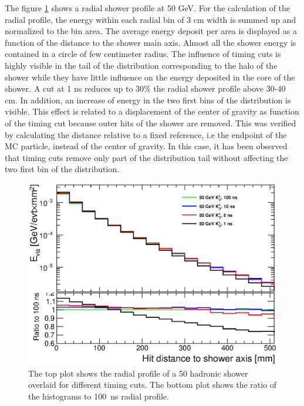 The figure \ref{fig:RadialProfNoSmearing} shows a \kzeroL{} radial shower profile at 50 GeV. For the calculation of the radial profile, the energy within each radial bin of 3 cm width is summed up and normalized to the bin area. The average energy deposit per area is displayed as a function of the distance to the shower main axis. Almost all the shower energy is contained in a circle of few centimeter radius. The influence of timing cuts is highly visible in the tail of the distribution corresponding to the halo of the shower while they have little influence on the energy deposited in the core of the shower. A cut at 1 ns reduces up to 30\% the radial shower profile above 30-40 cm. In addition, an increase of energy in the two first bins of the distribution is visible. This effect is related to a displacement of the center of gravity as function of the timing cut because outer hits of the shower are removed. This was verified by calculating the distance relative to a fixed reference, i.e the endpoint of the MC particle, instead of the center of gravity. In this case, it has been observed that timing cuts remove only part of the distribution tail without affecting the two first bin of the distribution.

\begin{figure}[htbp!]
  \centering
  \includegraphics[width=0.6\linewidth]{../Thesis_Plots/ILD/NoSmearing/Plots/RadialProfileOverlay_noSmearing.eps}
  \caption{The top plot shows the radial profile of a 50 \GeV hadronic shower overlaid for different timing cuts. The bottom plot shows the ratio of the histograms to \SI{100}{\nano\second} radial profile.} \label{fig:RadialProfNoSmearing}
\end{figure}

